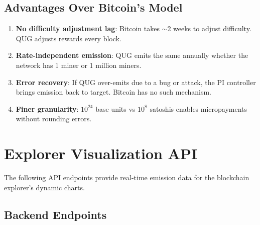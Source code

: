 \documentclass[11pt,a4paper]{article}
\begin{document}
\subsection{Advantages Over Bitcoin's Model}

\begin{enumerate}
    \item \textbf{No difficulty adjustment lag}: Bitcoin takes $\sim$2 weeks to adjust difficulty. QUG adjusts rewards every block.
    \item \textbf{Rate-independent emission}: QUG emits the same annually whether the network has 1 miner or 1 million miners.
    \item \textbf{Error recovery}: If QUG over-emits due to a bug or attack, the PI controller brings emission back to target. Bitcoin has no such mechanism.
    \item \textbf{Finer granularity}: $10^{24}$ base units vs $10^{8}$ satoshis enables micropayments without rounding errors.
\end{enumerate}

\section{Explorer Visualization API}
\label{sec:explorer}

The following API endpoints provide real-time emission data for the blockchain explorer's dynamic charts.

\subsection{Backend Endpoints}
\end{document}
